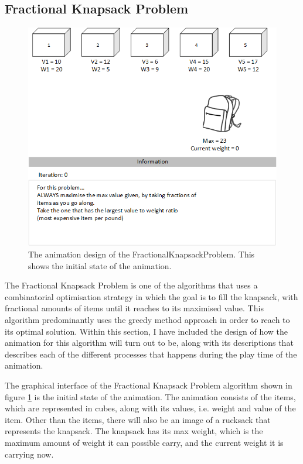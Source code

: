 \subsection{Fractional Knapsack Problem}
\begin{figure}[H]
\centering
\includegraphics[scale=1]{images/report_images/animationDesignFractionalKnapsackProblem.png}
\caption{The animation design of the FractionalKnapsackProblem. This shows the initial state of the animation.}
\label{animationDesignFractionalKnapsackProblem}
\end{figure}

The Fractional Knapsack Problem is one of the algorithms that uses a combinatorial optimisation strategy in which the goal is to fill the knapsack, with fractional amounts of items until it reaches to its maximised value. This algorithm predominantly uses the greedy method approach in order to reach to its optimal solution. Within this section, I have included the design of how the animation for this algorithm will turn out to be, along with its descriptions that describes each of the different processes that happens during the play time of the animation.

The graphical interface of the Fractional Knapsack Problem algorithm shown in figure \ref{animationDesignFractionalKnapsackProblem} is the initial state of the animation. The animation consists of the items, which are represented in cubes, along with its values, i.e. weight and value of the item. Other than the items, there will also be an image of a rucksack that represents the knapsack. The knapsack has its max weight, which is the maximum amount of weight it can possible carry, and the current weight it is carrying now.

